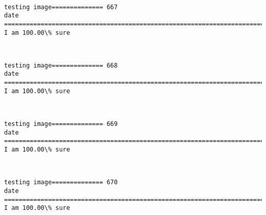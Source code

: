 \documentclass[11pt]{article}
\begin{document}
    \begin{center}
    \end{center}
    { \hspace*{\fill} \\}
    
    \begin{Verbatim}[commandchars=\\\{\}]
testing image============== 667
date
============================================================================
I am 100.00\% sure

    \end{Verbatim}

    \begin{center}
    \end{center}
    { \hspace*{\fill} \\}
    
    \begin{Verbatim}[commandchars=\\\{\}]
testing image============== 668
date
============================================================================
I am 100.00\% sure

    \end{Verbatim}

    \begin{center}
    \end{center}
    { \hspace*{\fill} \\}
    
    \begin{Verbatim}[commandchars=\\\{\}]
testing image============== 669
date
============================================================================
I am 100.00\% sure

    \end{Verbatim}

    \begin{center}
    \end{center}
    { \hspace*{\fill} \\}
    
    \begin{Verbatim}[commandchars=\\\{\}]
testing image============== 670
date
============================================================================
I am 100.00\% sure

    \end{Verbatim}
\end{document}
